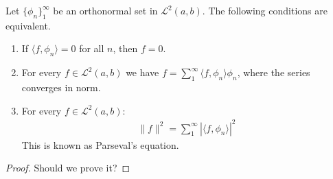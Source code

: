 \begin{theorem}
Let $\{\phi_n\}_1^\infty$ be an orthonormal set in $\mathcal{L}^2(a,b)$. The following conditions are equivalent.
\begin{enumerate}[label=(\alph*)]
\item If $\langle f, \phi_n \rangle = 0$ for all $n$, then $f = 0$.
\item For every $f \in \mathcal{L}^2(a,b)$ we have $f = \sum_1^\infty \langle f, \phi_n \rangle \phi_n$, where the series converges in norm.\\
\item For every $f \in \mathcal{L}^2(a,b)$:
\begin{align*}
\|f\|^2 = \sum_1^\infty |\langle f,\phi_n \rangle|^2
\end{align*}
This is known as Parseval's equation.
\end{enumerate}
\end{theorem}

\begin{proof}
Should we prove it?
\end{proof}